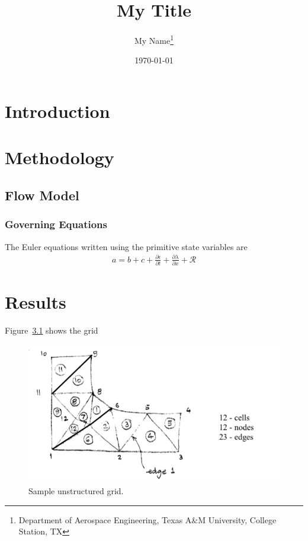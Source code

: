 \documentclass[12pt,fleqn]{report}
\title{My Title}
\author{
 My Name\thanks{Department of Aerospace Engineering, Texas A\&M University, College Station, TX}
}
\date{\today}
\newcommand{\ddt}[1]{\frac{\partial #1}{\partial t}}
\newcommand{\deriv}[2]{\frac{\partial #1}{\partial #2}}
\newcommand{\R}{\mathcal{R}}
\begin{document}
\maketitle
\tableofcontents
\newpage
\listoffigures
\newpage
\chapter{Introduction}
\label{ch:intro}

\chapter{Methodology}

\section{Flow Model}
\label{sec:fm}

\subsection{Governing Equations}
\label{sec:ge}

The Euler equations written using the primitive state variables are
% 
\begin{equation}
    \label{zetaNS}  
    \begin{aligned}
      a = b + c + \ddt{\epsilon} + \deriv{\lambda}{x} + \R
    \end{aligned}
\end{equation}
%
%
\chapter{Results}

Figure~\ref{fig:L4_1} shows the grid~\cite{ott93}
%
\begin{figure}[h]
  \centering
  \includegraphics[width=.75\linewidth]{fig/L4_1.png}
  \caption{Sample unstructured grid.}
  \label{fig:L4_1}
\end{figure}
\end{document}

